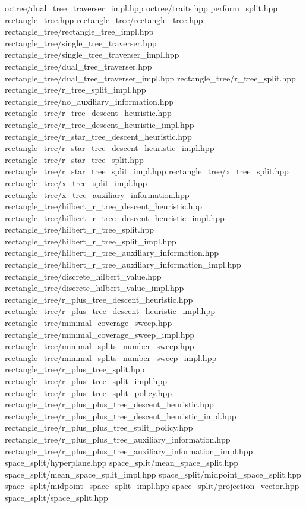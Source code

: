 \begin{DoxyCompactItemize}
octree/dual\+\_\+tree\+\_\+traverser\+\_\+impl.\+hpp octree/traits.\+hpp perform\+\_\+split.\+hpp rectangle\+\_\+tree.\+hpp rectangle\+\_\+tree/rectangle\+\_\+tree.\+hpp rectangle\+\_\+tree/rectangle\+\_\+tree\+\_\+impl.\+hpp rectangle\+\_\+tree/single\+\_\+tree\+\_\+traverser.\+hpp rectangle\+\_\+tree/single\+\_\+tree\+\_\+traverser\+\_\+impl.\+hpp rectangle\+\_\+tree/dual\+\_\+tree\+\_\+traverser.\+hpp rectangle\+\_\+tree/dual\+\_\+tree\+\_\+traverser\+\_\+impl.\+hpp rectangle\+\_\+tree/r\+\_\+tree\+\_\+split.\+hpp rectangle\+\_\+tree/r\+\_\+tree\+\_\+split\+\_\+impl.\+hpp rectangle\+\_\+tree/no\+\_\+auxiliary\+\_\+information.\+hpp rectangle\+\_\+tree/r\+\_\+tree\+\_\+descent\+\_\+heuristic.\+hpp rectangle\+\_\+tree/r\+\_\+tree\+\_\+descent\+\_\+heuristic\+\_\+impl.\+hpp rectangle\+\_\+tree/r\+\_\+star\+\_\+tree\+\_\+descent\+\_\+heuristic.\+hpp rectangle\+\_\+tree/r\+\_\+star\+\_\+tree\+\_\+descent\+\_\+heuristic\+\_\+impl.\+hpp rectangle\+\_\+tree/r\+\_\+star\+\_\+tree\+\_\+split.\+hpp rectangle\+\_\+tree/r\+\_\+star\+\_\+tree\+\_\+split\+\_\+impl.\+hpp rectangle\+\_\+tree/x\+\_\+tree\+\_\+split.\+hpp rectangle\+\_\+tree/x\+\_\+tree\+\_\+split\+\_\+impl.\+hpp rectangle\+\_\+tree/x\+\_\+tree\+\_\+auxiliary\+\_\+information.\+hpp rectangle\+\_\+tree/hilbert\+\_\+r\+\_\+tree\+\_\+descent\+\_\+heuristic.\+hpp rectangle\+\_\+tree/hilbert\+\_\+r\+\_\+tree\+\_\+descent\+\_\+heuristic\+\_\+impl.\+hpp rectangle\+\_\+tree/hilbert\+\_\+r\+\_\+tree\+\_\+split.\+hpp rectangle\+\_\+tree/hilbert\+\_\+r\+\_\+tree\+\_\+split\+\_\+impl.\+hpp rectangle\+\_\+tree/hilbert\+\_\+r\+\_\+tree\+\_\+auxiliary\+\_\+information.\+hpp rectangle\+\_\+tree/hilbert\+\_\+r\+\_\+tree\+\_\+auxiliary\+\_\+information\+\_\+impl.\+hpp rectangle\+\_\+tree/discrete\+\_\+hilbert\+\_\+value.\+hpp rectangle\+\_\+tree/discrete\+\_\+hilbert\+\_\+value\+\_\+impl.\+hpp rectangle\+\_\+tree/r\+\_\+plus\+\_\+tree\+\_\+descent\+\_\+heuristic.\+hpp rectangle\+\_\+tree/r\+\_\+plus\+\_\+tree\+\_\+descent\+\_\+heuristic\+\_\+impl.\+hpp rectangle\+\_\+tree/minimal\+\_\+coverage\+\_\+sweep.\+hpp rectangle\+\_\+tree/minimal\+\_\+coverage\+\_\+sweep\+\_\+impl.\+hpp rectangle\+\_\+tree/minimal\+\_\+splits\+\_\+number\+\_\+sweep.\+hpp rectangle\+\_\+tree/minimal\+\_\+splits\+\_\+number\+\_\+sweep\+\_\+impl.\+hpp rectangle\+\_\+tree/r\+\_\+plus\+\_\+tree\+\_\+split.\+hpp rectangle\+\_\+tree/r\+\_\+plus\+\_\+tree\+\_\+split\+\_\+impl.\+hpp rectangle\+\_\+tree/r\+\_\+plus\+\_\+tree\+\_\+split\+\_\+policy.\+hpp rectangle\+\_\+tree/r\+\_\+plus\+\_\+plus\+\_\+tree\+\_\+descent\+\_\+heuristic.\+hpp rectangle\+\_\+tree/r\+\_\+plus\+\_\+plus\+\_\+tree\+\_\+descent\+\_\+heuristic\+\_\+impl.\+hpp rectangle\+\_\+tree/r\+\_\+plus\+\_\+plus\+\_\+tree\+\_\+split\+\_\+policy.\+hpp rectangle\+\_\+tree/r\+\_\+plus\+\_\+plus\+\_\+tree\+\_\+auxiliary\+\_\+information.\+hpp rectangle\+\_\+tree/r\+\_\+plus\+\_\+plus\+\_\+tree\+\_\+auxiliary\+\_\+information\+\_\+impl.\+hpp space\+\_\+split/hyperplane.\+hpp space\+\_\+split/mean\+\_\+space\+\_\+split.\+hpp space\+\_\+split/mean\+\_\+space\+\_\+split\+\_\+impl.\+hpp space\+\_\+split/midpoint\+\_\+space\+\_\+split.\+hpp space\+\_\+split/midpoint\+\_\+space\+\_\+split\+\_\+impl.\+hpp space\+\_\+split/projection\+\_\+vector.\+hpp space\+\_\+split/space\+\_\+split.\+hpp 
\end{DoxyCompactItemize}
